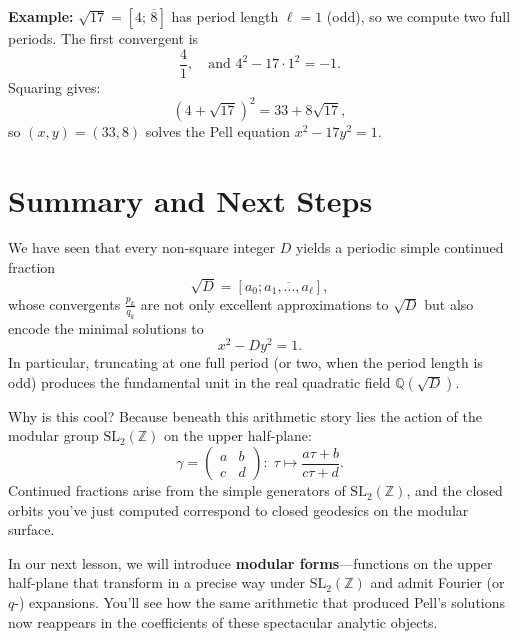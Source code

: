 \documentclass[11pt]{article}
\begin{document}
\textbf{Example:} \( \sqrt{17} = [4;\, \overline{8}] \) has period length \( \ell = 1 \) (odd), so we compute two full periods. The first convergent is
\[
\frac{4}{1}, \quad \text{and } 4^2 - 17 \cdot 1^2 = -1.
\]
Squaring gives:
\[
(4 + \sqrt{17})^2 = 33 + 8\sqrt{17},
\]
so \( (x, y) = (33, 8) \) solves the Pell equation \( x^2 - 17 y^2 = 1 \).

\section*{Summary and Next Steps}

We have seen that every non-square integer \(D\) yields a periodic simple continued fraction
\[
\sqrt{D}=[a_0;\overline{a_1,\dots,a_\ell}],
\]
whose convergents \(\tfrac{p_k}{q_k}\) are not only excellent approximations to \(\sqrt{D}\) but also encode the minimal solutions to
\[
x^2 - D y^2 = 1.
\]
In particular, truncating at one full period (or two, when the period length is odd) produces the fundamental unit in the real quadratic field \(\mathbb{Q}(\sqrt{D})\).

Why is this cool?  Because beneath this arithmetic story lies the action of the modular group \(\mathrm{SL}_2(\mathbb{Z})\) on the upper half-plane:
\[
\gamma=\begin{pmatrix}a&b\\c&d\end{pmatrix}:\; \tau\mapsto\frac{a\tau+b}{c\tau+d}.
\]
Continued fractions arise from the simple generators of \(\mathrm{SL}_2(\mathbb{Z})\), and the closed orbits you’ve just computed correspond to closed geodesics on the modular surface.  

In our next lesson, we will introduce \textbf{modular forms}—functions on the upper half-plane that transform in a precise way under \(\mathrm{SL}_2(\mathbb{Z})\) and admit Fourier (or \(q\)-) expansions.  You’ll see how the same arithmetic that produced Pell’s solutions now reappears in the coefficients of these spectacular analytic objects.
\end{document}
